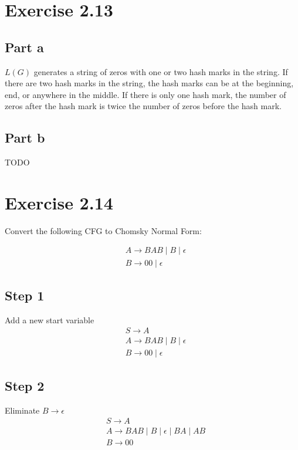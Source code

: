 \documentclass{article}
\begin{document}
\section{Exercise 2.13}

\subsection{Part a}

$L(G)$ generates a string of zeros with one or two hash marks in the string.
If there are two hash marks in the string, the hash marks can be at the
beginning, end, or anywhere in the middle. If there is only one hash mark, the
number of zeros after the hash mark is twice the number of zeros before the hash mark.

\subsection{Part b}

TODO

\section{Exercise 2.14}

Convert the following CFG to Chomsky Normal Form:

\begin{align*}
	& A \rightarrow BAB \mid B \mid \epsilon\\
	& B \rightarrow 00 \mid \epsilon
\end{align*}

\subsection*{Step 1}
	Add a new start variable
	\begin{align*}
		& S \rightarrow A\\
		& A \rightarrow BAB \mid B \mid \epsilon\\
		& B \rightarrow 00 \mid \epsilon
	\end{align*}
\subsection*{Step 2}
	Eliminate $B \rightarrow \epsilon$
	\begin{align*}
		& S \rightarrow A\\
		& A \rightarrow BAB \mid B \mid \epsilon \mid BA \mid AB\\
		& B \rightarrow 00 
	\end{align*}
\end{document}
